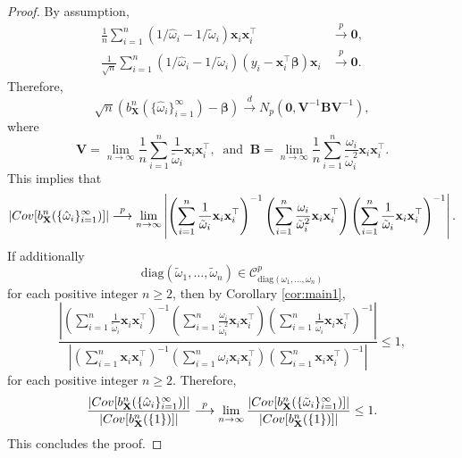 \documentclass[12pt]{article}
\newcommand{\Cov}[1]{{\rm{Cov}}[ #1 ]}
\newcommand{\bl}[1]{{\mathbf #1}}
\newcommand{\bs}[1]{\boldsymbol #1}
\begin{document}
\begin{proof}
By assumption,
\begin{equation*}
\begin{aligned}
    \frac{1}{n} \sum_{i=1}^n (1/\hat{\omega}_i - 1/\tilde{\omega}_i)\bl{x}_i \bl{x}_i^\top &\overset{p}{\longrightarrow} \bl{0}, \\
    \frac{1}{\sqrt{n}} \sum_{i=1}^n (1/\hat{\omega}_i - 1/\tilde{\omega}_i)(y_i - \bl{x}_i^\top\bs{\beta}) \bl{x}_i &\overset{p}{\longrightarrow} \bl{0}.
\end{aligned}
\end{equation*}
Therefore, 
\begin{equation*}
    \sqrt{n}(b^{n}_{\bl{X}}(\{\hat{\omega}_i\}_{i=1}^\infty) - \bs{\beta}) \overset{d}{\longrightarrow} N_p(\bl{0}, \bl{V}^{-1} \bl{B} \bl{V}^{-1}),
\end{equation*}
where
\begin{equation*}
    \bl{V} = \lim_{n \rightarrow \infty} \frac{1}{n}\sum_{i=1}^{n} \frac{1}{\tilde{\omega}_i}\bl{x}_i \bl{x}_i^\top,~\text{ and }~\bl{B} = \lim_{n \rightarrow \infty} \frac{1}{n}\sum_{i=1}^{n} \frac{\omega_i}{\tilde{\omega}^2_i}\bl{x}_i \bl{x}_i^\top.
\end{equation*}
This implies that
\begin{equation*}
    |\Cov{ b^{n}_{\bl{X}}(\{\hat{\omega}_i\}_{i=1}^{\infty})}| \overset{p}{\longrightarrow} \lim_{n \rightarrow \infty}\left| \left( \sum_{i=1}^n \frac{1}{\tilde{\omega}_i} \bl{x}_i \bl{x}_i^\top\right)^{-1} \left( \sum_{i=1}^n \frac{\omega_i}{\tilde{\omega}^2_i} \bl{x}_i \bl{x}_i^\top\right) \left( \sum_{i=1}^n \frac{1}{\tilde{\omega}_i} \bl{x}_i \bl{x}_i^\top\right)^{-1} \right|.
\end{equation*}
If additionally
\begin{equation*}
    \mathrm{diag}(\tilde{\omega}_1, \dots, \tilde{\omega}_n) \in \mathcal{C}^p_{\mathrm{diag}({\omega}_1, \dots, \omega_n)}
\end{equation*}
for each positive integer $n \geq 2$, then by Corollary \ref{cor:main1},
\begin{equation*}
    \frac{\left| \left( \sum_{i=1}^n \frac{1}{\tilde{\omega}_i} \bl{x}_i \bl{x}_i^\top\right)^{-1} \left( \sum_{i=1}^n \frac{\omega_i}{\tilde{\omega}^2_i} \bl{x}_i \bl{x}_i^\top\right) \left( \sum_{i=1}^n \frac{1}{\tilde{\omega}_i} \bl{x}_i \bl{x}_i^\top\right)^{-1} \right|}{\left| \left( \sum_{i=1}^n \bl{x}_i \bl{x}_i^\top\right)^{-1}\left( \sum_{i=1}^n \omega_i \bl{x}_i \bl{x}_i^\top\right) \left( \sum_{i=1}^n \bl{x}_i \bl{x}_i^\top\right)^{-1}\right|} \leq 1,
\end{equation*}
for each positive integer $n \geq 2$. Therefore,
\begin{equation*}
    \frac{|\Cov{ b^{n}_{\bl{X}}(\{\hat{\omega}_i\}_{i=1}^{\infty})}|}{|\Cov{ b^n_{\bl{X}}(\{1\})}|} \overset{p}{\longrightarrow} \lim_{n \rightarrow \infty}\frac{|\Cov{ b^{n}_{\bl{X}}(\{\tilde{\omega}_i\}_{i=1}^{\infty})}|}{|\Cov{ b^n_{\bl{X}}(\{1\})}|} \leq 1.
\end{equation*}
This concludes the proof.
\end{proof}
\end{document}
